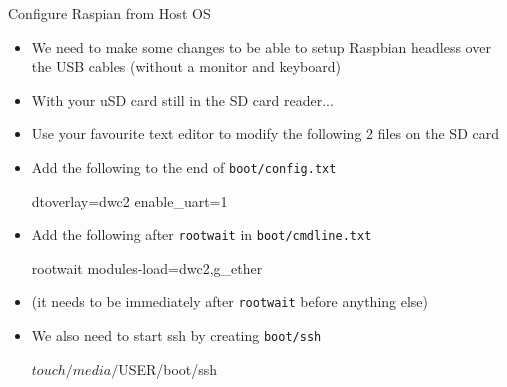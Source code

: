 \begin{frame}
   {Configure Raspian from Host OS}
   \begin{itemize}
      \item We need to make some changes to be able to setup Raspbian headless
	      over the USB cables (without a monitor and keyboard)
      \item With your uSD card still in the SD card reader...
      \item Use your favourite text editor to modify the following 2 files on the SD card
      \item Add the following to the end of \verb?boot/config.txt?
         \begin{raw}
dtoverlay=dwc2
enable_uart=1
         \end{raw}
      \item Add the following after \verb?rootwait? in \verb?boot/cmdline.txt?
         \begin{raw}
rootwait modules-load=dwc2,g_ether
         \end{raw}
      \item (it needs to be immediately after \verb?rootwait? before anything else)
      \item We also need to start ssh by creating \verb?boot/ssh?
         \begin{raw}
$ touch /media/$USER/boot/ssh
         \end{raw}
   \end{itemize}
\end{frame}

\cprotect{}

